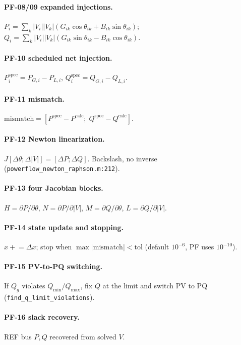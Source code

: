 \documentclass[12pt,a4paper]{article}
\begin{document}
\paragraph{PF-08/09 expanded injections.}
$P_i=\sum_k |V_i||V_k|(G_{ik}\cos\theta_{ik}+B_{ik}\sin\theta_{ik})$;
$Q_i=\sum_k |V_i||V_k|(G_{ik}\sin\theta_{ik}-B_{ik}\cos\theta_{ik})$.

\paragraph{PF-10 scheduled net injection.}
$P_i^{\mathrm{spec}}=P_{G,i}-P_{L,i}$, $Q_i^{\mathrm{spec}}=Q_{G,i}-Q_{L,i}$.

\paragraph{PF-11 mismatch.}
$\text{mismatch}=[P^{\mathrm{spec}}-P^{\mathrm{calc}};\;Q^{\mathrm{spec}}-Q^{\mathrm{calc}}]$.

\paragraph{PF-12 Newton linearization.}
$J[\Delta\theta;\Delta|V|]=[\Delta P;\Delta Q]$. Backslash, no inverse
(\texttt{powerflow\_newton\_raphson.m:212}).

\paragraph{PF-13 four Jacobian blocks.}
$H=\partial P/\partial\theta$, $N=\partial P/\partial|V|$,
$M=\partial Q/\partial\theta$, $L=\partial Q/\partial|V|$.

\paragraph{PF-14 state update and stopping.}
$x\mathrel{+}=\Delta x$; stop when $\max|\text{mismatch}|<\text{tol}$ (default
$10^{-6}$, PF uses $10^{-10}$).

\paragraph{PF-15 PV-to-PQ switching.}
If $Q_g$ violates $Q_{\min}/Q_{\max}$, fix $Q$ at the limit and switch PV to PQ
(\texttt{find\_q\_limit\_violations}).

\paragraph{PF-16 slack recovery.} REF bus $P,Q$ recovered from solved $V$.
\end{document}
